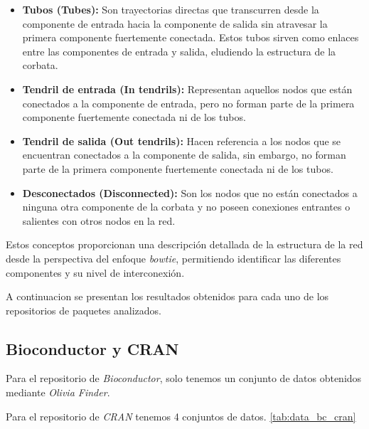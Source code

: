 \begin{itemize}
    \item \textbf{Tubos (Tubes):} Son trayectorias directas que transcurren desde la componente de entrada hacia la componente de salida sin atravesar la primera componente fuertemente conectada. Estos tubos sirven como enlaces entre las componentes de entrada y salida, eludiendo la estructura de la corbata.

    \item \textbf{Tendril de entrada (In tendrils):} Representan aquellos nodos que están conectados a la componente de entrada, pero no forman parte de la primera componente fuertemente conectada ni de los tubos.

    \item \textbf{Tendril de salida (Out tendrils):} Hacen referencia a los nodos que se encuentran conectados a la componente de salida, sin embargo, no forman parte de la primera componente fuertemente conectada ni de los tubos.

    \item \textbf{Desconectados (Disconnected):} Son los nodos que no están conectados a ninguna otra componente de la corbata y no poseen conexiones entrantes o salientes con otros nodos en la red.

\end{itemize}

Estos conceptos proporcionan una descripción detallada de la estructura de la red desde la perspectiva del enfoque \textit{bowtie}, permitiendo identificar las diferentes componentes y su nivel de interconexión.

A continuacion se presentan los resultados obtenidos para cada uno de los repositorios de paquetes analizados.

\subsection{Bioconductor y CRAN}

Para el repositorio de \textit{Bioconductor}, solo tenemos un conjunto de datos obtenidos mediante \textit{Olivia Finder}.

Para el repositorio de \textit{CRAN} tenemos 4 conjuntos de datos. \ref{tab:data_bc_cran}

